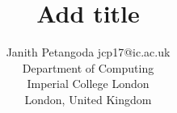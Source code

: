 \documentclass[twoside,11pt]{article}
\renewcommand{\|}{\ensuremath{\:\big|\:}}
\begin{document}
      
\title{Add title}

\author{\name Janith Petangoda \email jcp17@ic.ac.uk \\
       \addr Department of Computing\\
	   Imperial College London\\
	   London, United Kingdom
       }


\maketitle

\begin{abstract}%
\end{abstract}

\begin{keywords}
  
\end{keywords}


 \newpage
 
% 
\end{document}
